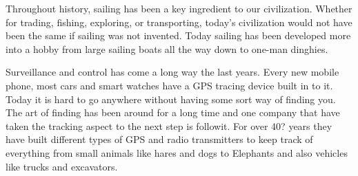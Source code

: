 Throughout history, sailing has been a key ingredient to our civilization. Whether for trading, fishing, exploring, or transporting, today's civilization would not have been the same if sailing was not invented. Today sailing has been developed more into a hobby from large sailing boats all the way down to one-man dinghies. 


Surveillance and control has come a long way the last years. Every new mobile phone, most cars and smart watches have a GPS tracing device built in to it. Today it is hard to go anywhere without having some sort way of finding you. The art of finding has been around for a long time and one company that have taken the tracking aspect to the next step is followit. For over 40? years they have built different types of GPS and radio transmitters to keep track of everything from small animals like hares and dogs to Elephants and also vehicles like trucks and excavators.

\thispagestyle{empty}